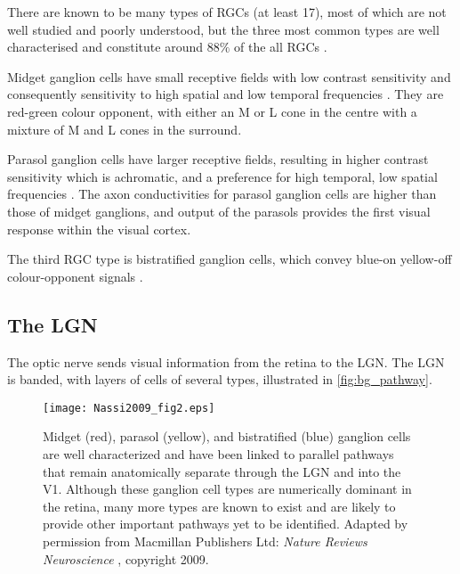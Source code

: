 There are known to be many types of \acp{RGC} (at least \num{17}), most of which are not well studied and poorly understood, but the three most common types are well characterised and constitute around $88\%$ of the all \acp{RGC} \citep{Nassi2009}.

Midget ganglion cells have small receptive fields with low contrast sensitivity and consequently sensitivity to high spatial and low temporal frequencies \citep{Nassi2009}.
They are red-green colour opponent, with either an \ac{M} or \ac{L} cone in the centre with a mixture of \ac{M} and \ac{L} cones in the surround.

Parasol ganglion cells have larger receptive fields, resulting in higher contrast sensitivity which is achromatic, and a preference for high temporal, low spatial frequencies \citep{Nassi2009}.
The axon conductivities for parasol ganglion cells are higher than those of midget ganglions, and output of the parasols provides the first visual response within the visual cortex.

The third \ac{RGC} type is bistratified ganglion cells, which convey blue-on yellow-off colour-opponent signals \citep{Nassi2009}.



\subsection{The \acl{LGN}}

The optic nerve sends visual information from the retina to the \ac{LGN}.
The \ac{LGN} is banded, with layers of cells of several types, illustrated in \autoref{fig:bg_pathway}.

\begin{figure}[htb]
\centering
\texttt{[image: Nassi2009\_fig2.eps]}
\caption{
Midget (red), parasol (yellow), and bistratified (blue) ganglion cells are well characterized and have been linked to parallel pathways that remain anatomically separate through the \ac{LGN} and into the \ac{V1}.
Although these ganglion cell types are numerically dominant in the retina, many more types are known to exist and are likely to provide other important pathways yet to be identified.
Adapted by permission from Macmillan Publishers Ltd: \textit{Nature Reviews Neuroscience} \citep{Nassi2009}, copyright 2009.
}
\label{fig:bg_pathway}
\end{figure}

